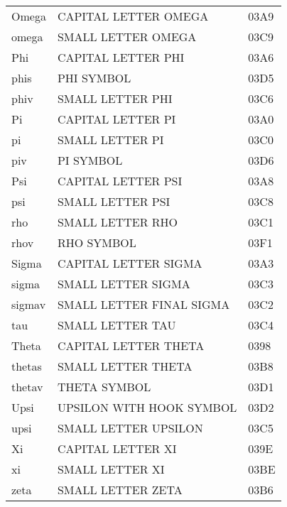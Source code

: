 \documentclass{book}
\begin{document}
\begin{longtable}{!{\vrule width6pt}l|l|l!{\vrule width6pt}}
Omega              &  CAPITAL LETTER OMEGA          & 03A9\\
omega              &  SMALL LETTER OMEGA            & 03C9\\
Phi                &  CAPITAL LETTER PHI            & 03A6\\
phis               &  PHI SYMBOL                    & 03D5\\
phiv               &  SMALL LETTER PHI              & 03C6\\
Pi                 &  CAPITAL LETTER PI             & 03A0\\
pi                 &  SMALL LETTER PI               & 03C0\\
piv                &  PI SYMBOL                     & 03D6\\
Psi                &  CAPITAL LETTER PSI            & 03A8\\
psi                &  SMALL LETTER PSI              & 03C8\\
rho                &  SMALL LETTER RHO              & 03C1\\
rhov               &  RHO SYMBOL                    & 03F1\\
Sigma              &  CAPITAL LETTER SIGMA          & 03A3\\
sigma              &  SMALL LETTER SIGMA            & 03C3\\
sigmav             &  SMALL LETTER FINAL SIGMA      & 03C2\\
tau                &  SMALL LETTER TAU              & 03C4\\
Theta              &  CAPITAL LETTER THETA          & 0398\\
thetas             &  SMALL LETTER THETA            & 03B8\\
thetav             &  THETA SYMBOL                  & 03D1\\
Upsi               &  UPSILON WITH HOOK SYMBOL      & 03D2\\
upsi               &  SMALL LETTER UPSILON          & 03C5\\
Xi                 &  CAPITAL LETTER XI             & 039E\\
xi                 &  SMALL LETTER XI               & 03BE\\
zeta               &  SMALL LETTER ZETA             & 03B6\\
\end{longtable}
\end{document}
